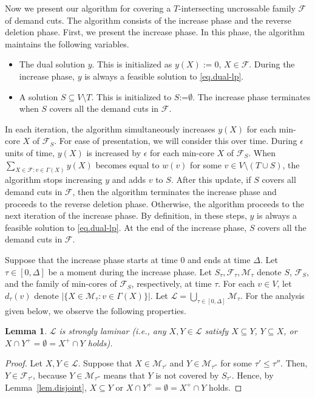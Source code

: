 \documentclass[11pt]{article}
\newcommand{\Ffam}{\mathcal{F}}
\newcommand{\Mfam}{\mathcal{M}}
\newcommand{\Lfam}{\mathcal{L}}
\newtheorem{lemma}{Lemma}
\begin{document}
Now we present  our algorithm for covering a $T$-intersecting uncrossable family $\Ffam$
  of demand cuts.
  The algorithm consists of the increase phase and the reverse deletion
 phase.
 First, we present the increase phase.
In this phase, the algorithm maintains the following variables.

  \begin{itemize}
   \item  The dual solution $y$.
	  This is initialized as $y(X):=0$, $X \in \Ffam$.
	  During the increase phase, $y$ is always a
	  feasible solution to \eqref{eq.dual-lp}.
   \item  A solution $S \subseteq V \setminus T$.
	  This is initialized to $S$:=$\emptyset$. The increase phase terminates when $S$ covers all the demand cuts in $\Ffam$.
  \end{itemize}

   In each iteration, the algorithm simultaneously increases $y(X)$ for each min-core
   $X$ of $\Ffam_S$.
   For ease of presentation, we will consider this over time.
   During $\epsilon$ units of time, $y(X)$ is increased by
   $\epsilon$ for each min-core $X$ of $\Ffam_S$.
   When $\sum_{X \in \Ffam\colon v \in \Gamma(X)}y(X)$ becomes equal to $w(v)$ for some $v
 \in V \setminus (T \cup S)$,
 the algorithm stops increasing $y$
 and adds $v$ to $S$.
After this update, if $S$ covers all demand cuts in $\Ffam$, then
the algorithm terminates the increase phase and proceeds to the
 reverse deletion phase.
 Otherwise, the algorithm proceeds to the next iteration of the increase
   phase.
 By definition, in these steps, $y$ is always a feasible solution to
 \eqref{eq.dual-lp}.
 At the end of the increase phase, $S$ covers all the demand cuts in $\Ffam$.
 
 Suppose that the increase phase
 starts at time $0$ and ends at time $\Delta$.
 Let $\tau \in [0,\Delta]$ be a moment during the increase phase.
 Let $S_{\tau}, \Ffam_{\tau}, \Mfam_{\tau}$ denote $S$, $\Ffam_S$,
 and the family of min-cores of $\Ffam_S$, respectively,
 at time $\tau$.
 For each $v \in V$, let $d_{\tau}(v)$ denote $|\{X \in \Mfam_{\tau}\colon v
 \in \Gamma(X)\}|$.
 Let $\Lfam =\bigcup_{\tau \in [0,\Delta]}\Mfam_{\tau}$.
 For the analysis given below, we observe the following properties.


 
  \begin{lemma}
   \label{lem.stronglaminar}
  $\Lfam$ is strongly laminar (i.e., any $X,Y\in \Lfam$ satisfy $X\subseteq Y$, $Y \subseteq X$, or $X \cap Y^+ = \emptyset = X^+ \cap Y$ holds).
  \end{lemma}
\begin{proof}
 Let $X,Y \in \Lfam$. Suppose that $X \in \Mfam_{\tau'}$ and $Y \in
 \Mfam_{\tau''}$
 for some $\tau' \leq \tau''$.
 Then, $Y \in \Ffam_{\tau'}$, because $Y \in \Mfam_{\tau''}$ means that $Y$ is
 not covered by $S_{\tau'}$.
 Hence, by Lemma~\ref{lem.disjoint}, $X \subseteq Y$ or $X\cap
 Y^+=\emptyset=X^+ \cap Y$ holds.
\end{proof}
 
\end{document}

